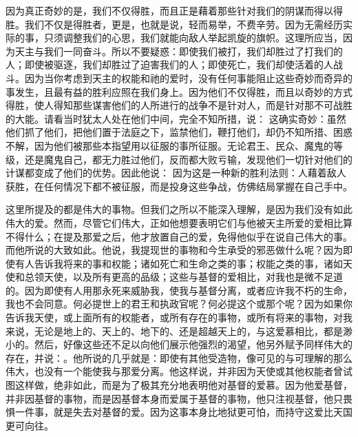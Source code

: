  \par

因为真正奇妙的是，我们不仅得胜，而且正是藉着那些针对我们的阴谋而得以得胜。我们不仅是得胜者，更是，也就是说，轻而易举，不费辛劳。因为无需经历实际的事，只须调整我们的心思，我们就能向敌人举起凯旋的旗帜。这理所应当，因为天主与我们一同奋斗。所以不要疑惑：即使我们被打，我们却胜过了打我们的人；即使被驱逐，我们却胜过了迫害我们的人；即使死亡，我们却使活着的人战斗。因为当你考虑到天主的权能和祂的爱时，没有任何事能阻止这些奇妙而奇异的事发生，且最有益的胜利应照在我们身上。因为他们不仅得胜，而且以奇妙的方式得胜，使人得知那些谋害他们的人所进行的战争不是针对人，而是针对那不可战胜的大能。请看当时犹太人处在他们中间，完全不知所措，说：  这确实奇妙：虽然他们抓了他们，把他们置于法庭之下，监禁他们，鞭打他们，却仍不知所措、困惑不解，因为他们被那些本指望用以征服的事所征服。无论君王、民众、魔鬼的等级，还是魔鬼自己，都无力胜过他们，反而都大败亏输，发现他们一切针对他们的计谋都变成了他们的优势。因此他说： 因为这是一种新的胜利法则：人藉着敌人获胜，在任何情况下都不被征服，而是投身这些争战，仿佛结局掌握在自己手中。\par

\par

这里所提及的都是伟大的事物。但我们之所以不能深入理解，是因为我们没有如此伟大的爱。然而，尽管它们伟大，正如他想要表明它们与他被天主所爱的爱相比算不得什么；在提及那爱之后，他才放置自己的爱，免得他似乎在说自己伟大的事。而他所说的大致如此。他说，我提现世的事物和今生承受的邪恶做什么呢？因为即使有人告诉我将来的事和权能；诸如死亡和生命之类的事；权能之类的事，诸如天使和总领天使，以及所有更高的品级；这些与基督的爱相比，对我也是微不足道的。因为即使有人用那永死来威胁我，使我与基督分离，或者应许我不朽的生命，我也不会同意。何必提世上的君王和执政官呢？何必提这个或那个呢？因为如果你告诉我天使，或上面所有的权能者，或所有存在的事物，或所有将来的事物，对我来说，无论是地上的、天上的、地下的、还是超越天上的，与这爱慕相比，都是渺小的。然后，好像这些还不足以向他们展示他强烈的渴望，他另外赋予同样伟大的存在，并说：。他所说的几乎就是：即使有其他受造物，像可见的与可理解的那么伟大，也没有一个能使我与那爱分离。他这样说，并非因为天使或其他权能者曾试图这样做，绝非如此，而是为了极其充分地表明他对基督的爱慕。因为他爱基督，并非因基督的事物，而是因基督本身而爱属于基督的事物，他只注视基督，他只畏惧一件事，就是失去对基督的爱。因为这事本身比地狱更可怕，而持守这爱比天国更可向往。\par

